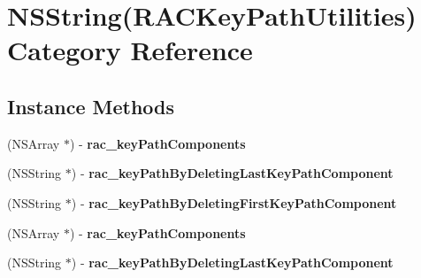 \hypertarget{category_n_s_string_07_r_a_c_key_path_utilities_08}{}\section{N\+S\+String(R\+A\+C\+Key\+Path\+Utilities) Category Reference}
\label{category_n_s_string_07_r_a_c_key_path_utilities_08}
\subsection*{Instance Methods}
\begin{DoxyCompactItemize}
\item 
\mbox{\label{category_n_s_string_07_r_a_c_key_path_utilities_08_a7297adece3baebb3fdae06b22ff32f0a}} 
(N\+S\+Array $\ast$) -\/ {\bfseries rac\+\_\+key\+Path\+Components}
\item 
\mbox{\label{category_n_s_string_07_r_a_c_key_path_utilities_08_a271796bb7289b16588453e1a7a8db1f3}} 
(N\+S\+String $\ast$) -\/ {\bfseries rac\+\_\+key\+Path\+By\+Deleting\+Last\+Key\+Path\+Component}
\item 
\mbox{\label{category_n_s_string_07_r_a_c_key_path_utilities_08_adf1fe82d6788653e105383a8e8b3a50f}} 
(N\+S\+String $\ast$) -\/ {\bfseries rac\+\_\+key\+Path\+By\+Deleting\+First\+Key\+Path\+Component}
\item 
\mbox{\label{category_n_s_string_07_r_a_c_key_path_utilities_08_a7297adece3baebb3fdae06b22ff32f0a}} 
(N\+S\+Array $\ast$) -\/ {\bfseries rac\+\_\+key\+Path\+Components}
\item 
\mbox{\label{category_n_s_string_07_r_a_c_key_path_utilities_08_a271796bb7289b16588453e1a7a8db1f3}} 
(N\+S\+String $\ast$) -\/ {\bfseries rac\+\_\+key\+Path\+By\+Deleting\+Last\+Key\+Path\+Component}
\item 
\mbox{\label{category_n_s_string_07_r_a_c_key_path_utilities_08_adf1fe82d6788653e105383a8e8b3a50f}} 

\end{DoxyCompactItemize}
